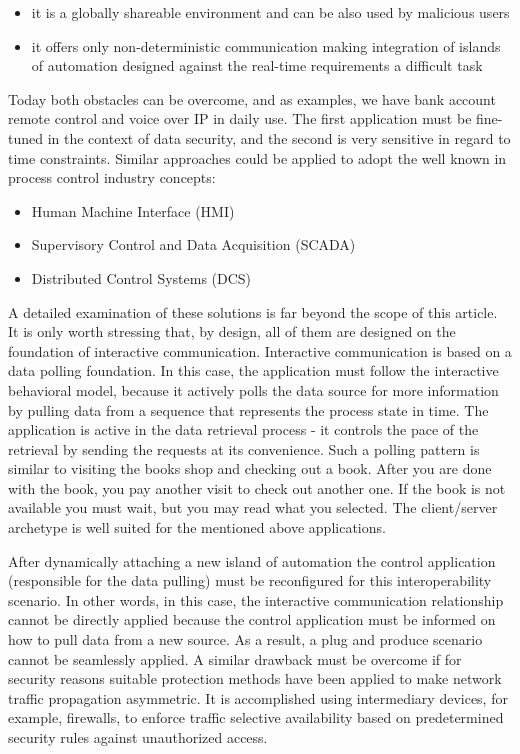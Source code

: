 \documentclass{jacsart}
\begin{document}
\begin{itemize}
      \item it is a globally shareable environment and can be also used by malicious users
      \item it offers only non-deterministic communication making integration of islands of automation designed against the real-time requirements a difficult task
\end{itemize}

Today both obstacles can be overcome, and as examples, we have bank account remote control and voice over IP in daily use. The first application must be fine-tuned in the context of data security, and the second is very sensitive in regard to time constraints. Similar approaches could be applied to adopt the well known in process control industry concepts:

\begin{itemize}
      \item  Human Machine Interface (HMI)
      \item Supervisory Control and Data Acquisition (SCADA)
      \item Distributed Control Systems (DCS)
\end{itemize}

A detailed examination of these solutions is far beyond the scope of this article. It is only worth stressing that, by design, all of them are designed on the foundation of interactive communication. Interactive communication is based on a data polling foundation. In this case, the application must follow the interactive behavioral model, because it actively polls the data source for more information by pulling data from a sequence that represents the process state in time. The application is active in the data retrieval process - it controls the pace of the retrieval by sending the requests at its convenience. Such a polling pattern is similar to visiting the books shop and checking out a book. After you are done with the book, you pay another visit to check out another one. If the book is not available you must wait, but you may read what you selected. The client/server archetype is well suited for the mentioned above applications.

After dynamically attaching a new island of automation the control application (responsible for the data pulling) must be reconfigured for this interoperability scenario. In other words, in this case, the interactive communication relationship cannot be directly applied because the control application must be informed on how to pull data from a new source. As a result, a plug and produce scenario cannot be seamlessly applied. A similar drawback must be overcome if for security reasons suitable protection methods have been applied to make network traffic propagation asymmetric. It is accomplished using intermediary devices, for example, firewalls, to enforce traffic selective availability based on predetermined security rules against unauthorized access.
\end{document}
